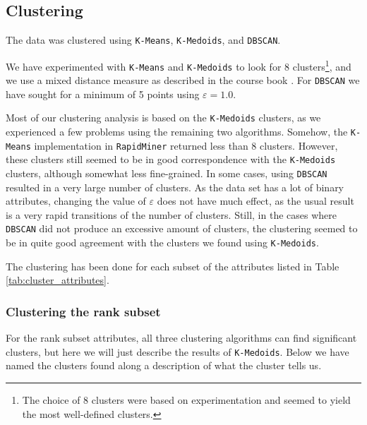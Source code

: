 \subsection{Clustering}
\label{subsec:clustering}

The data was clustered using \texttt{K-Means}, \texttt{K-Medoids}, and \texttt{DBSCAN}.

We have experimented with \texttt{K-Means} and \texttt{K-Medoids} to look for 8 clusters\footnote{The choice of 8 clusters were based on experimentation and seemed to yield the most well-defined clusters.}, and we use a mixed distance measure as described in the course book \cite{book}. For \texttt{DBSCAN} we have sought for a minimum of 5 points using $\varepsilon = 1.0$.

Most of our clustering analysis is based on the \texttt{K-Medoids} clusters, as we experienced a few problems using the remaining two algorithms. Somehow, the \texttt{K-Means} implementation in \texttt{RapidMiner} returned less than 8 clusters. However, these clusters still seemed to be in good correspondence with the \texttt{K-Medoids} clusters, although somewhat less fine-grained. In some cases, using \texttt{DBSCAN} resulted in a very large number of clusters. As the data set has a lot of binary attributes, changing the value of $\varepsilon$ does not have much effect, as the usual result is a very rapid transitions of the number of clusters. Still, in the cases where \texttt{DBSCAN} did not produce an excessive amount of clusters, the clustering seemed to be in quite good agreement with the clusters we found using \texttt{K-Medoids}.

The clustering has been done for each subset of the attributes listed in Table \ref{tab:cluster_attributes}.

\subsubsection{Clustering the rank subset}

For the rank subset attributes, all three clustering algorithms can find significant clusters, but here we will just describe the results of \texttt{K-Medoids}. Below we have named the clusters found along a description of what the cluster tells us.

